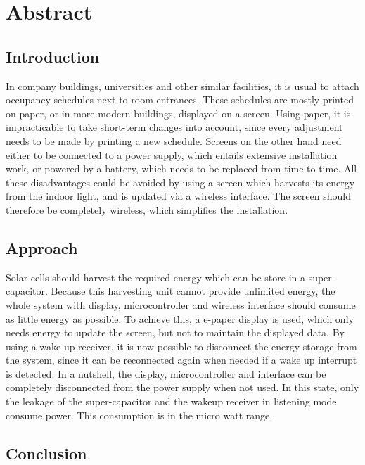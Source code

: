 \chapter*{Abstract}

\section*{Introduction}
In company buildings, universities and other similar facilities, it is usual to attach occupancy schedules next to room entrances.
These schedules are mostly printed on paper, or in more modern buildings, displayed on a screen.
Using paper, it is impracticable to take short-term changes into account, since every adjustment needs to be made by printing a new schedule.
Screens on the other hand need either to be connected to a power supply, which entails extensive installation work, or powered by a battery, which needs to be replaced from time to time.
All these disadvantages could be avoided by using a screen which harvests its energy from the indoor light, and is updated via a wireless interface.
The screen should therefore be completely wireless, which simplifies the installation.

\section*{Approach}
Solar cells should harvest the required energy which can be store in a super-capacitor.
Because this harvesting unit cannot provide unlimited energy, the whole system with display, microcontroller and wireless interface should consume as little energy as possible.
To achieve this, a e-paper display is used, which only needs energy to update the screen, but not to maintain the displayed data.
By using a wake up receiver, it is now possible to disconnect the energy storage from the system, since it can be reconnected again when needed if a wake up interrupt is detected.
In a nutshell, the display, microcontroller and interface can be completely disconnected from the power supply when not used.
In this state, only the leakage of the super-capacitor and the wakeup receiver in listening mode consume power.
This consumption is in the micro watt range.

\section*{Conclusion}
